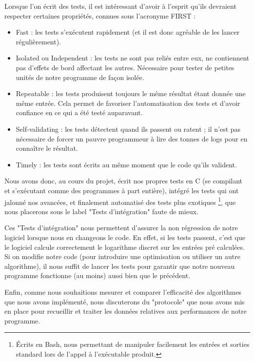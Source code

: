       Lorsque l'on écrit des tests, il est intéressant d'avoir à l'esprit qu'ils devraient respecter certaines propriétés, connues sous l'acronyme FIRST :
      \begin{itemize}
        \item Fast : les tests s'exécutent rapidement (et il est donc agréable de les lancer régulièrement).
        \item Isolated ou Independent : les tests ne sont pas reliés entre eux, ne contiennent pas d'effets de bord affectant les autres. Nécessaire pour tester de petites unités de notre programme de façon isolée.
        \item Repeatable : les tests produisent toujours le même résultat étant donnée une même entrée. Cela permet de favoriser l'automatisation des tests et d'avoir confiance en ce qui a été testé auparavant.
        \item Self-validating : les tests détectent quand ils passent ou ratent ; il n'est pas nécessaire de forcer un pauvre programmeur à lire des tonnes de logs pour en connaître le résultat.
        \item Timely : les tests sont écrits au même moment que le code qu'ils valident.
      \end{itemize}

      Nous avons donc, au cours du projet, écrit nos propres tests en C (se compilant et s'exécutant comme des programmes à part entière), intégré les tests qui ont jalonné nos avancées, et finalement automatisé des tests plus exotiques \footnote{Écrits en Bash, nous permettant de manipuler facilement les entrées et sorties standard lors de l'appel à l'exécutable produit.}, que nous placerons sous le label "Tests d'intégration" faute de mieux.

      Ces "Tests d'intégration" nous permettent d'assurer la non régression de notre logiciel lorsque nous en changeons le code. En effet, si les tests passent, c'est que le logiciel calcule correctement le logarithme discret sur les entrées pré calculées. Si on modifie notre code (pour introduire une optimisation ou utiliser un autre algorithme), il nous suffit de lancer les tests pour garantir que notre nouveau programme fonctionne (au moins) aussi bien que le précédent.

      Enfin, comme nous souhaitions mesurer et comparer l'efficacité des algorithmes que nous avons implémenté, nous discuterons du "protocole" que nous avons mis en place pour recueillir et traiter les données relatives aux performances de notre programme.


